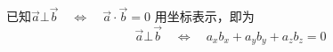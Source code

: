 已知$\vec{a}\bot \vec{b}\quad \Longleftrightarrow \quad \vec{a}\cdot \vec{b}=0$
用坐标表示，即为
\begin{equation}
    \vec{a}\bot \vec{b}\quad \Longleftrightarrow \quad a_xb_x+a_yb_y+a_zb_z=0
\end{equation}















































































































